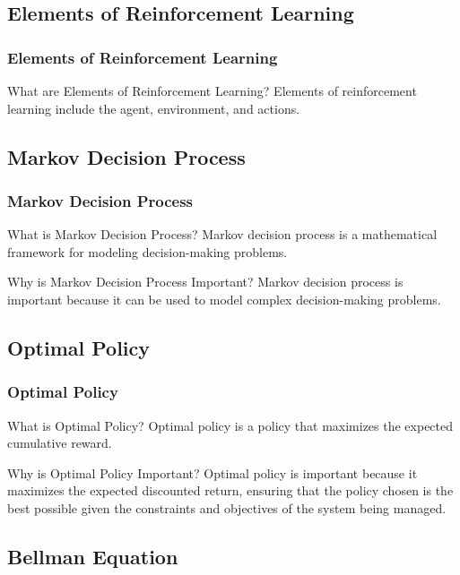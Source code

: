 \documentclass[aspectratio=169, hideothersubsections]{beamer}
\begin{document}
\subsection{Elements of Reinforcement Learning}

\begin{frame}
  \frametitle{Elements of Reinforcement Learning}
  \begin{block}{What are Elements of Reinforcement Learning?}
    Elements of reinforcement learning include the agent, environment, and actions.
  \end{block}
\end{frame}

\subsection{Markov Decision Process}

\begin{frame}
  \frametitle{Markov Decision Process}
  \begin{block}{What is Markov Decision Process?}
    Markov decision process is a mathematical framework for modeling decision-making problems.
  \end{block}
  \begin{block}{Why is Markov Decision Process Important?}
    Markov decision process is important because it can be used to model complex decision-making problems.
  \end{block}
\end{frame}

\subsection{Optimal Policy}

\begin{frame}
  \frametitle{Optimal Policy}
  \begin{block}{What is Optimal Policy?}
    Optimal policy is a policy that maximizes the expected cumulative reward.
  \end{block}
  \begin{block}{Why is Optimal Policy Important?}
   Optimal policy is important because it maximizes the expected discounted return, ensuring that the policy chosen is the best possible given the constraints and objectives of the system being managed.
  \end{block}
\end{frame}

\subsection{Bellman Equation}
\end{document}

